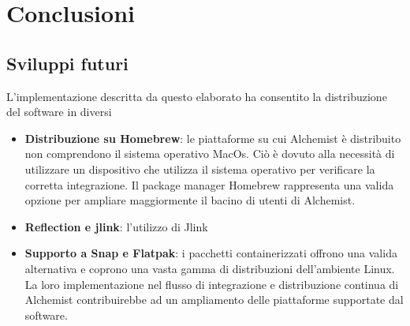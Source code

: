 
\chapter{Conclusioni}


\section{Sviluppi futuri}

L'implementazione descritta da questo elaborato ha consentito la distribuzione del software in diversi 

\begin{itemize}
	\item \textbf{Distribuzione su Homebrew}: le piattaforme su cui Alchemist è distribuito non comprendono il sistema operativo MacOs. Ciò è dovuto alla necessità di utilizzare un dispositivo che utilizza il sistema operativo per verificare la corretta integrazione. Il package manager Homebrew rappresenta una valida opzione per ampliare maggiormente il bacino di utenti di Alchemist.
	\item \textbf{Reflection e jlink}: l'utilizzo di Jlink
	\item \textbf{Supporto a Snap e Flatpak}: i pacchetti containerizzati offrono una valida alternativa e coprono una vasta gamma di distribuzioni dell'ambiente Linux. La loro implementazione nel flusso di integrazione e distribuzione continua di Alchemist contribuirebbe ad un ampliamento delle piattaforme supportate dal software. %
\end{itemize}